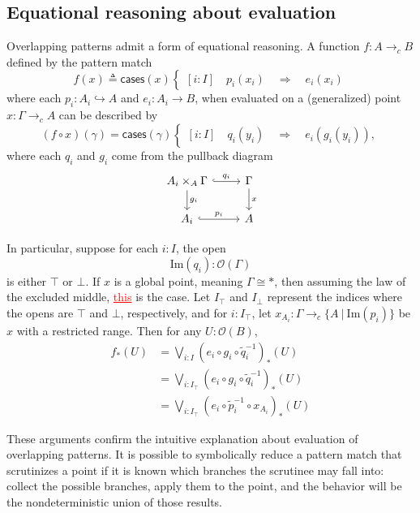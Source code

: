 \documentclass[conference]{IEEEtran}
\newcommand{\hookto}{\hookrightarrow}
\newcommand{\cto}{\to_c}
\newcommand{\suchthat}{\ |\ }
\newcommand{\One}{\ast}
\newcommand{\Open}[1]{\mathcal{O}({#1})}
\newcommand{\Img}[1]{\text{Im}\left({#1}\right)}
\newcommand{\Branch}{\Rightarrow}
\newcommand{\grammar}[1]{\textcolor{red}{\underline{#1}}}
\begin{document}
\subsection{Equational reasoning about evaluation}

Overlapping patterns admit a form of equational reasoning. A function $f : A \cto B$ defined by the pattern match
\[
f(x) \triangleq \mathsf{cases}(x)
\begin{cases}
[i : I] \quad p_i(x_i) \quad \Branch \quad e_i(x_i)
\end{cases}
\]
where each $p_i : A_i \hookto A$ and $e_i : A_i \to B$,
when evaluated on a (generalized) point $x : \Gamma \cto A$
can be described by
\[
(f \circ x)(\gamma) = \mathsf{cases}(\gamma)
\begin{cases}
[i : I] \quad q_i(y_i) \quad \Branch \quad e_i(g_i(y_i)),
\end{cases}
\]
where each $q_i$ and $g_i$ come from the pullback diagram
\begin{equation*}
\begin{tikzcd}
A_i \times_A \Gamma \arrow[r, hook, "q_i"]
   \arrow[d, "g_i"]
& \Gamma \arrow[d, "x"]
\\ A_i \arrow[r, hook, "p_i"]
& A
\end{tikzcd}
\end{equation*}

In particular, suppose for each $i : I$, the open
\[
\Img{q_i} : \Open{\Gamma}
\]
is either $\top$ or $\bot$. If $x$ is a global point, meaning $\Gamma \cong \One$, then assuming the law of the excluded middle, \grammar{this} is the case. Let $I_\top$ and $I_\bot$ represent the indices where the opens are $\top$ and $\bot$, respectively, and for $i : I_\top$, let $x_{A_i} : \Gamma \cto \{ A \suchthat \Img{p_i} \}$ be $x$ with a restricted range. Then for any $U : \Open{B}$,
\begin{align*}
f_*(U) &= \bigvee_{i : I} (e_i \circ g_i \circ \tilde{q}_i^{-1})_*(U)
\\ &= \bigvee_{i : I_\top} (e_i \circ g_i \circ \tilde{q}_i^{-1})_*(U)
\\ &= \bigvee_{i : I_\top} (e_i \circ \tilde{p}_i^{-1} \circ x_{A_i})_*(U)
\end{align*}

These arguments confirm the intuitive explanation about evaluation of overlapping patterns. It is possible to symbolically reduce a pattern match that scrutinizes a point if it is known which branches the scrutinee may fall into: collect the possible branches, apply them to the point, and the behavior will be the nondeterministic union of those results.
\end{document}
